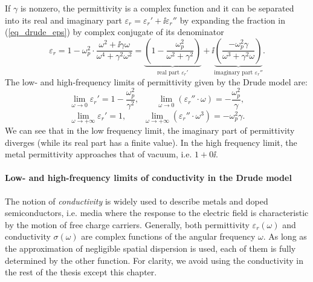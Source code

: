 If $\gamma$ is nonzero, the permittivity is a complex function and it can be separated into its real and imaginary part $\varepsilon_r = \varepsilon_r'+\ii\varepsilon_r''$ by expanding the fraction in (\ref{eq_drude_eps}) by complex conjugate of its denominator
\begin{equation} \varepsilon_r = 1 - \omega_p^{2} \cdot \frac{\omega^{2} + \ii \gamma \omega}{\omega^{4} + \gamma^{2} \omega^{2}} = 
		\underbrace{\left(1 - \frac{\omega_p^2}{\omega^2+\gamma^2}\right) }_{\text{real part } \varepsilon_r'}
+ \ii	\underbrace{\left(\frac{-\omega_p^2\gamma}{\omega^3 + \gamma^2\omega}\right) }_{\text{imaginary part } \varepsilon_r''}.
\label{eq_drude_eps_loss}\end{equation}
The low- and high-frequency limits of permittivity given by the Drude model are:
\begin{equation} \lim_{\omega \to 0} \varepsilon_r' = 1-\frac{\omega_p^2}{\gamma^2}, \quad \quad  
				 \lim_{\omega \to 0} (\varepsilon_r'' \cdot \omega) = -\frac{\omega_p^2}{\gamma},\label{eq_drude_limlow}\end{equation}
\begin{equation} \lim_{\omega \to +\infty} \varepsilon_r' = 1, \quad \quad  
				 \lim_{\omega \to +\infty} (\varepsilon_r'' \cdot \omega^3) = -\omega_p^2 \gamma. \label{eq_drude_limup}\end{equation}
We can see that in the low frequency limit, the imaginary part of permittivity diverges (while its real part has a finite value). In the high frequency limit, the metal permittivity approaches that of vacuum, i.e. $1+0\ii$.
\label{chap_fdtd_drude}
\paragraph{Low- and high-frequency limits of conductivity in the Drude model}%
The notion of \textit{conductivity} is widely used to describe metals and doped semiconductors, i.e. media where the response to the electric field is characteristic by the motion of free charge carriers. 
Generally, both permittivity $\varepsilon_r(\omega)$ and conductivity $\sigma(\omega)$ are complex functions of the angular frequency $\omega$. As long as the approximation of negligible spatial dispersion is used, each of them is fully determined by the other function. %
For clarity, we avoid using the conductivity in the rest of the thesis except this chapter.

